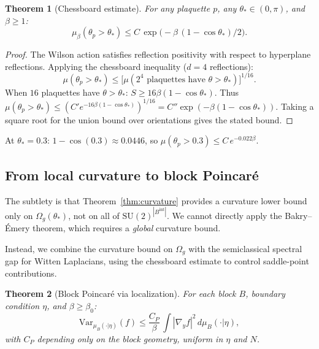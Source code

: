 \documentclass[11pt,a4paper]{article}
\theoremstyle{plain}
\newtheorem{theorem}{Theorem}[section]
\theoremstyle{definition}
\theoremstyle{remark}
\newcommand{\SU}{\mathrm{SU}}
\newcommand{\Var}{\mathrm{Var}}
\begin{document}
\begin{theorem}[Chessboard estimate]\label{thm:chessboard}
For any plaquette $p$, any $\theta_* \in (0, \pi)$, and $\beta \geq 1$:
\begin{equation}
\mu_\beta(\theta_p > \theta_*)
\leq C\,\exp\bigl(-\beta\,(1 - \cos\theta_*)/2\bigr).
\end{equation}
\end{theorem}

\begin{proof}
The Wilson action satisfies reflection positivity with respect to
hyperplane reflections. Applying the chessboard inequality ($d = 4$
reflections):
\begin{equation}
\mu(\theta_p > \theta_*)
\leq \bigl[\mu(\text{$2^4$ plaquettes have } \theta > \theta_*)\bigr]^{1/16}.
\end{equation}
When $16$ plaquettes have $\theta > \theta_*$:
$S \geq 16\beta(1-\cos\theta_*)$.
Thus $\mu(\theta_p > \theta_*) \leq (C'e^{-16\beta(1-\cos\theta_*)})^{1/16}
= C''\exp(-\beta(1-\cos\theta_*))$.
Taking a square root for the union bound over orientations gives the
stated bound.
\end{proof}

At $\theta_* = 0.3$: $1 - \cos(0.3) \approx 0.0446$, so
$\mu(\theta_p > 0.3) \leq C\,e^{-0.022\beta}$.

\subsection{From local curvature to block Poincar\'e}

The subtlety is that Theorem~\ref{thm:curvature} provides a curvature
lower bound only on $\Omega_g(\theta_*)$, not on all of
$\SU(2)^{|B^{\mathrm{int}}|}$. We cannot directly apply the
Bakry--\'Emery theorem, which requires a \emph{global} curvature bound.

Instead, we combine the curvature bound on $\Omega_g$ with the
semiclassical spectral gap for Witten Laplacians, using the chessboard
estimate to control saddle-point contributions.

\begin{theorem}[Block Poincar\'e via localization]\label{thm:block-poincare-local}
For each block $B$, boundary condition $\eta$, and $\beta \geq \beta_0$:
\begin{equation}
\Var_{\mu_B(\cdot|\eta)}(f)
\leq \frac{C_P}{\beta}\,
\int |\nabla_y f|^2\,d\mu_B(\cdot|\eta),
\end{equation}
with $C_P$ depending only on the block geometry,
uniform in $\eta$ and $N$.
\end{theorem}
\end{document}
